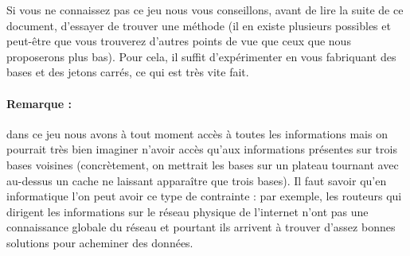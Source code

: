 Si vous ne connaissez pas ce jeu nous vous conseillons, avant de lire la suite de ce document, d'essayer de trouver une méthode (il en existe plusieurs possibles et peut-être que vous trouverez d'autres points de vue que ceux que nous proposerons plus bas). Pour cela, il suffit d'expérimenter en vous fabriquant des bases et des jetons carrés, ce qui est très vite fait.


\paragraph{Remarque :} \hspace{-1em} dans ce jeu nous avons à tout moment accès à toutes les informations mais on pourrait très bien imaginer n'avoir accès qu'aux informations présentes sur trois bases voisines (concrètement, on mettrait les bases sur un plateau tournant avec au-dessus un cache ne laissant apparaître que trois bases). Il faut savoir qu'en informatique l'on peut avoir ce type de contrainte : par exemple, les routeurs qui dirigent les informations sur le réseau physique de l'internet n'ont pas une connaissance globale du réseau et pourtant ils arrivent à trouver d'assez bonnes solutions pour acheminer des données.
